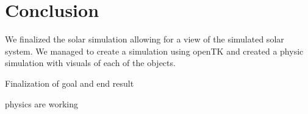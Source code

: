 
\section{Conclusion}
We finalized the solar simulation allowing for a view of the simulated solar system. 
We managed to create a simulation using openTK and created a physic simulation with visuals of each of the objects.

Finalization of goal and end result

physics are working